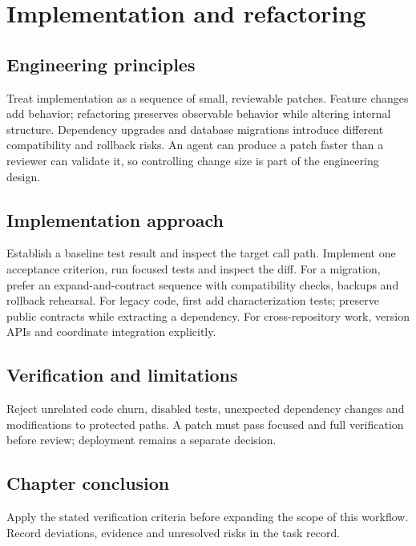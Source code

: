 \chapter{Implementation and refactoring}

\section{Engineering principles}

Treat implementation as a sequence of small, reviewable patches. Feature changes add behavior; refactoring preserves observable behavior while altering internal structure. Dependency upgrades and database migrations introduce different compatibility and rollback risks. An agent can produce a patch faster than a reviewer can validate it, so controlling change size is part of the engineering design.

\section{Implementation approach}

Establish a baseline test result and inspect the target call path. Implement one acceptance criterion, run focused tests and inspect the diff. For a migration, prefer an expand-and-contract sequence with compatibility checks, backups and rollback rehearsal. For legacy code, first add characterization tests; preserve public contracts while extracting a dependency. For cross-repository work, version APIs and coordinate integration explicitly.

\section{Verification and limitations}

Reject unrelated code churn, disabled tests, unexpected dependency changes and modifications to protected paths. A patch must pass focused and full verification before review; deployment remains a separate decision.

\section{Chapter conclusion}

Apply the stated verification criteria before expanding the scope of this workflow. Record deviations, evidence and unresolved risks in the task record.
